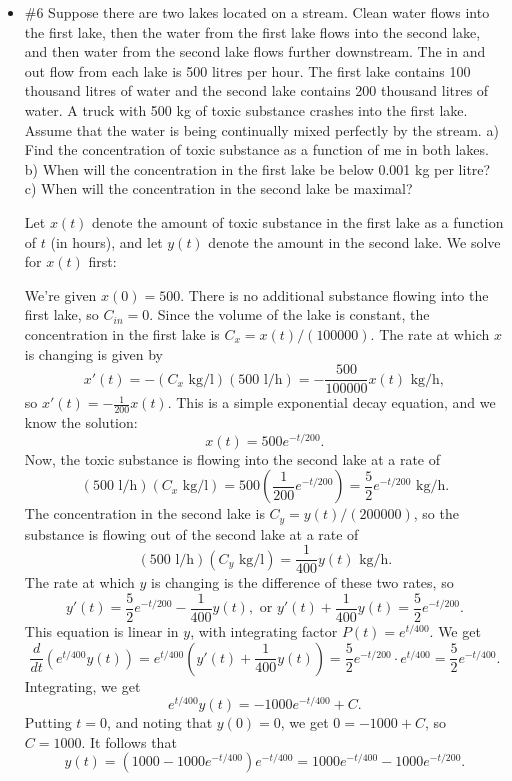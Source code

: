 \documentclass[12pt,letterpaper]{article}
\begin{document}
\begin{itemize}
\item \#6 Suppose there are two lakes located on a stream. Clean
water flows into the first lake, then the water from the first
lake flows into the second lake, and then water from the
second lake flows further downstream. The in and out flow
from each lake is 500 litres per hour. The first lake contains
100 thousand litres of water and the second lake contains
200 thousand litres of water. A truck with 500 kg of toxic
substance crashes into the first lake. Assume that the water is being continually mixed perfectly by the stream. a)
Find the concentration of toxic substance as a function of
me in both lakes. b) When will the concentration in the
first lake be below 0.001 kg per litre? c) When will the concentration in the second lake be maximal?

\bigskip

Let $x(t)$ denote the amount of toxic substance in the first lake as a function of $t$ (in hours), and let $y(t)$ denote the amount in the second lake. We solve for $x(t)$ first:

We're given $x(0)=500$. There is no additional substance flowing into the first lake, so $C_{in}=0$. Since the volume of the lake is constant, the concentration in the first lake is $C_x = x(t)/(100000)$. The rate at which $x$ is changing is given by
\[
x'(t) = -(C_x \text{ kg/l})(500 \text{ l/h}) = -\frac{500}{100000}x(t) \text{ kg/h},
\]
so $x'(t) = -\frac{1}{200}x(t)$. This is a simple exponential decay equation, and we know the solution:
\[
x(t) = 500e^{-t/200}.
\]
Now, the toxic substance is flowing into the second lake at a rate of
\[
(500 \text{ l/h})(C_x \text{ kg/l}) = 500\left(\frac{1}{200}e^{-t/200}\right)=\frac52 e^{-t/200} \text{ kg/h}.
\]
The concentration in the second lake is $C_y = y(t)/(200000)$, so the substance is flowing out of the second lake at a rate of
\[
(500 \text{ l/h})(C_y \text{ kg/l}) = \frac{1}{400}y(t) \text{ kg/h}.
\]
The rate at which $y$ is changing is the difference of these two rates, so
\[
y'(t) = \frac52 e^{-t/200}-\frac{1}{400}y(t), \text{ or } y'(t) + \frac{1}{400}y(t) = \frac52 e^{-t/200}.
\]
This equation is linear in $y$, with integrating factor $P(t) = e^{t/400}$. We get
\[
\frac{d}{dt}(e^{t/400}y(t)) = e^{t/400}\left(y'(t)+\frac{1}{400}y(t)\right) = \frac52 e^{-t/200}\cdot e^{t/400} = \frac52 e^{-t/400}.
\]
Integrating, we get
\[
e^{t/400}y(t) = -1000e^{-t/400}+C.
\]
Putting $t=0$, and noting that $y(0)=0$, we get $0=-1000+C$, so $C=1000$. It follows that
\[
y(t) = (1000-1000e^{-t/400})e^{-t/400} = 1000e^{-t/400}-1000e^{-t/200}.
\]


\end{itemize}
\end{document}
